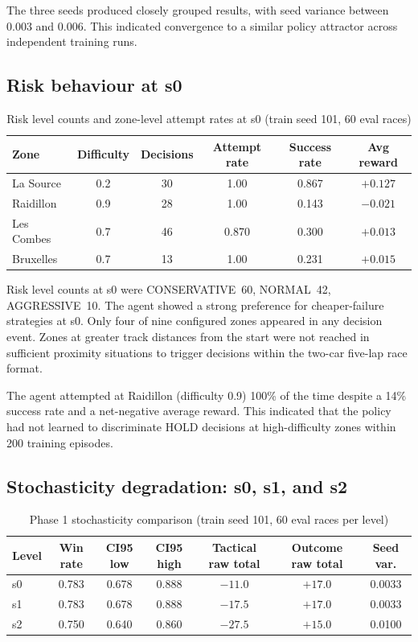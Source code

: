 \begin{appendices}
The three seeds produced closely grouped results, with seed variance between 0.003 and 0.006. This indicated convergence to a similar policy attractor across independent training runs.

\subsection{Risk behaviour at s0}

\begin{table}[htbp]
\centering
\small
\caption{Risk level counts and zone-level attempt rates at s0 (train seed 101, 60 eval races)}
\label{tab:phase1-s0-risk}
\begin{tabular}{|l|c|c|c|c|c|}
\hline
\textbf{Zone} & \textbf{Difficulty} & \textbf{Decisions} & \textbf{Attempt rate} & \textbf{Success rate} & \textbf{Avg reward} \\
\hline
La Source       & 0.2 & 30 & 1.00 & 0.867 & $+0.127$ \\
Raidillon       & 0.9 & 28 & 1.00 & 0.143 & $-0.021$ \\
Les Combes      & 0.7 & 46 & 0.870 & 0.300 & $+0.013$ \\
Bruxelles       & 0.7 & 13 & 1.00 & 0.231 & $+0.015$ \\
\hline
\end{tabular}
\end{table}

Risk level counts at s0 were CONSERVATIVE~60, NORMAL~42, AGGRESSIVE~10. The agent showed a strong preference for cheaper-failure strategies at s0. Only four of nine configured zones appeared in any decision event. Zones at greater track distances from the start were not reached in sufficient proximity situations to trigger decisions within the two-car five-lap race format.

The agent attempted at Raidillon (difficulty 0.9) 100\% of the time despite a 14\% success rate and a net-negative average reward. This indicated that the policy had not learned to discriminate HOLD decisions at high-difficulty zones within 200 training episodes.

\subsection{Stochasticity degradation: s0, s1, and s2}

\begin{table}[htbp]
\centering
\small
\caption{Phase 1 stochasticity comparison (train seed 101, 60 eval races per level)}
\label{tab:phase1-stoch}
\begin{tabular}{|l|c|c|c|c|c|c|}
\hline
\textbf{Level} & \textbf{Win rate} & \textbf{CI95 low} & \textbf{CI95 high} & \textbf{Tactical raw total} & \textbf{Outcome raw total} & \textbf{Seed var.} \\
\hline
s0 & 0.783 & 0.678 & 0.888 & $-11.0$ & $+17.0$ & 0.0033 \\
s1 & 0.783 & 0.678 & 0.888 & $-17.5$ & $+17.0$ & 0.0033 \\
s2 & 0.750 & 0.640 & 0.860 & $-27.5$ & $+15.0$ & 0.0100 \\
\hline
\end{tabular}
\end{table}


\end{appendices}
